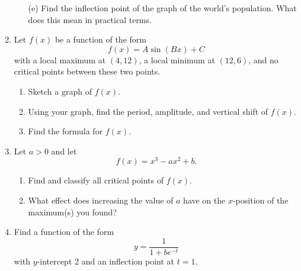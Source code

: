 \documentclass[11pt]{article}
\begin{document}
\begin{enumerate}
\begin{enumerate}
  \item[(e)] Find the inflection point of the graph of the world's
    population.  What does this mean in practical terms.

    \vfill
\end{enumerate}
  
  \newpage

\item Let $f(x)$ be a function of the form
  \[
  f(x) = A\sin(Bx)+C
  \]
  with a local maximum at $(4, 12)$, a local minimum at $(12, 6)$, and
  no critical points between these two points.

  \begin{enumerate}
  \item Sketch a graph of $f(x)$.
    \vfill
  \item Using your graph, find the period, amplitude, and vertical shift of $f(x)$.
    \vfill
  \item Find the formula for $f(x)$.
    \vfill
  \end{enumerate}

  \newpage
  
\item Let $a > 0$ and let
  \[
  f(x) = x^3-ax^2+b.
  \]
  \begin{enumerate}
  \item Find and classify all critical points of $f(x)$.
    \vfill
  \item What effect does increasing the value of $a$ have on the
    $x$-position of the maximum(s) you found?
    \vfill
  \end{enumerate}

  \newpage

\item Find a function of the form
  \[
  y = \frac{1}{1+be^{-t}}
  \]
  with $y$-intercept 2 and an inflection point at $t=1$.

\end{enumerate}
\end{document}
